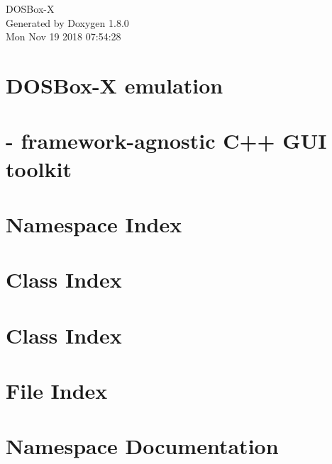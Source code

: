 \documentclass{book}
\begin{document}
\hypersetup{pageanchor=false,citecolor=blue}
\begin{titlepage}
\vspace*{7cm}
\begin{center}
{\Large D\-O\-S\-Box-\/\-X }\\
\vspace*{1cm}
{\large Generated by Doxygen 1.8.0}\\
\vspace*{0.5cm}
{\small Mon Nov 19 2018 07:54:28}\\
\end{center}
\end{titlepage}
\clearemptydoublepage
{}
\tableofcontents
\clearemptydoublepage
{}
\hypersetup{pageanchor=true,citecolor=blue}
\chapter{D\-O\-S\-Box-\/\-X emulation}
\label{index}\hypertarget{index}{}
\chapter{-\/ framework-\/agnostic C++ G\-U\-I toolkit}
\label{gui::tk}
\hypertarget{gui::tk}{}

\chapter{Namespace Index}

\chapter{Class Index}

\chapter{Class Index}

\chapter{File Index}

\chapter{Namespace Documentation}


\end{document}
